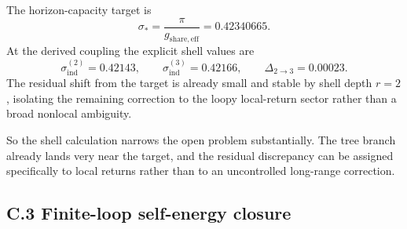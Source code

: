 \documentclass[11pt]{article}
\begin{document}
The horizon-capacity target is
\[
\sigma_*=\frac{\pi}{g_{\mathrm{share,eff}}}=0.42340665.
\]
At the derived coupling the explicit shell values are
\[
\sigma_{\mathrm{ind}}^{(2)}=0.42143,
\qquad
\sigma_{\mathrm{ind}}^{(3)}=0.42166,
\qquad
\Delta_{2\to 3}=0.00023.
\]
The residual shift from the target is already small and stable by shell depth $r=2$, isolating the remaining correction to the loopy local-return sector rather than a broad nonlocal ambiguity.

So the shell calculation narrows the open problem substantially. The tree branch already lands very near the target, and the residual discrepancy can be assigned specifically to local returns rather than to an uncontrolled long-range correction.

\subsection*{C.3 Finite-loop self-energy closure}
\end{document}
